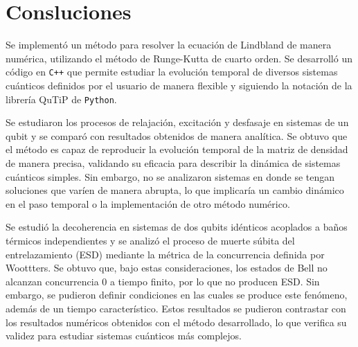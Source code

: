 \section{Consluciones} \label{sec: conclusion}

Se implementó un método para resolver la ecuación de Lindbland de manera numérica, utilizando el método de Runge-Kutta de cuarto orden. Se desarrolló un código en \texttt{C++} que permite estudiar la evolución temporal de diversos sistemas cuánticos definidos por el usuario de manera flexible y siguiendo la notación de la librería QuTiP de \texttt{Python}. 

Se estudiaron los procesos de relajación, excitación y desfasaje en sistemas de un qubit y se comparó con resultados obtenidos de manera analítica. Se obtuvo que el método es capaz de reproducir la evolución temporal de la matriz de densidad de manera precisa, validando su eficacia para describir la dinámica de sistemas cuánticos simples. Sin embargo, no se analizaron sistemas en donde se tengan soluciones que varíen de manera abrupta, lo que implicaría un cambio dinámico en el paso temporal o la implementación de otro método numérico.

Se estudió la decoherencia en sistemas de dos qubits idénticos acoplados a baños térmicos independientes y se analizó el proceso de muerte súbita del entrelazamiento (ESD) mediante la métrica de la concurrencia definida por Woottters. Se obtuvo que, bajo estas consideraciones, los estados de Bell no alcanzan concurrencia 0 a tiempo finito, por lo que no producen ESD. Sin embargo, se pudieron definir condiciones en las cuales se produce este fenómeno, además de un tiempo característico. Estos resultados se pudieron contrastar con los resultados numéricos obtenidos con el método desarrollado, lo que verifica su validez para estudiar sistemas cuánticos más complejos.